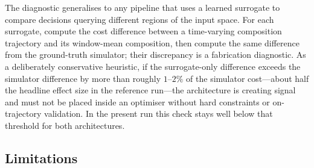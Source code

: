 \documentclass[11pt]{article}
\begin{document}
The diagnostic generalises to any pipeline that uses a learned surrogate to
compare decisions querying different regions of the input space. For each
surrogate, compute the cost difference between
a time-varying composition trajectory and its window-mean composition, then
compute the same difference from the ground-truth simulator; their discrepancy
is a fabrication diagnostic. As a deliberately conservative heuristic, if the
surrogate-only difference exceeds the simulator difference by more than roughly
$1$--$2\%$ of the simulator cost---about half the headline effect size in the
reference run---the architecture is creating signal and must not be placed
inside an optimiser without hard constraints or on-trajectory validation. In
the present run this check stays well below that threshold for both
architectures.

\subsection{Limitations}
\label{sec:limitations}

%
%
%
%
\end{document}
